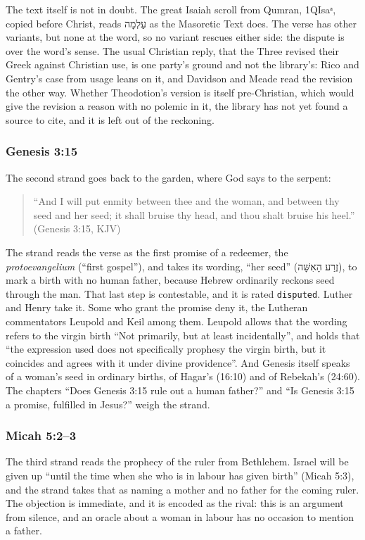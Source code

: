 \documentclass[11pt]{article}
\begin{document}
The text itself is not in doubt. The great Isaiah scroll from Qumran, 1QIsaᵃ, copied before Christ, reads עַלְמָה as the Masoretic Text does. The verse has other variants, but none at the word, so no variant rescues either side: the dispute is over the word’s sense. The usual Christian reply, that the Three revised their Greek against Christian use, is one party’s ground and not the library’s: Rico and Gentry’s case from usage leans on it, and Davidson and Meade read the revision the other way. Whether Theodotion’s version is itself pre-Christian, which would give the revision a reason with no polemic in it, the library has not yet found a source to cite, and it is left out of the reckoning.

\subsubsection*{Genesis 3:15}
The second strand goes back to the garden, where God says to the serpent:

\begin{quote}
“And I will put enmity between thee and the woman, and between thy seed and her seed; it shall bruise thy head, and thou shalt bruise his heel.” (Genesis 3:15, KJV)

\end{quote}
The strand reads the verse as the first promise of a redeemer, the \emph{protoevangelium} (“first gospel”), and takes its wording, “her seed” (זֶרַע הָאִשָּׁה), to mark a birth with no human father, because Hebrew ordinarily reckons seed through the man. That last step is contestable, and it is rated \texttt{disputed}. Luther and Henry take it. Some who grant the promise deny it, the Lutheran commentators Leupold and Keil among them. Leupold allows that the wording refers to the virgin birth “Not primarily, but at least incidentally”, and holds that “the expression used does not specifically prophesy the virgin birth, but it coincides and agrees with it under divine providence”. And Genesis itself speaks of a woman’s seed in ordinary births, of Hagar’s (16:10) and of Rebekah’s (24:60). The chapters “Does Genesis 3:15 rule out a human father?” and “Is Genesis 3:15 a promise, fulfilled in Jesus?” weigh the strand.

\subsubsection*{Micah 5:2–3}
The third strand reads the prophecy of the ruler from Bethlehem. Israel will be given up “until the time when she who is in labour has given birth” (Micah 5:3), and the strand takes that as naming a mother and no father for the coming ruler. The objection is immediate, and it is encoded as the rival: this is an argument from silence, and an oracle about a woman in labour has no occasion to mention a father.
\end{document}
